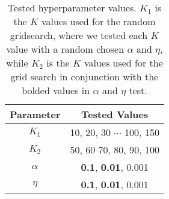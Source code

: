 \begin{table}[h]
	\centering
	\caption{Tested hyperparameter values. $K_1$ is the $K$ values used for the random gridsearch, where we tested each $K$ value with a random chosen $\alpha$ and $\eta$, while $K_2$ is the $K$ values used for the grid search in conjunction with the bolded values in $\alpha$ and $\eta$ test.}
	\begin{tabular}{c|c}
		Parameter & Tested Values\\
		\midrule
		$K_1$ & 10, 20, 30 $\cdots$ 100, 150\\
		$K_2$ & 50, 60 70, 80, 90, 100\\
		$\alpha$ & \textbf{0.1}, \textbf{0.01}, 0.001\\
		$\eta$ & \textbf{0.1}, \textbf{0.01}, 0.001\\
	\end{tabular}
	\label{tab:gridsearch}
\end{table}